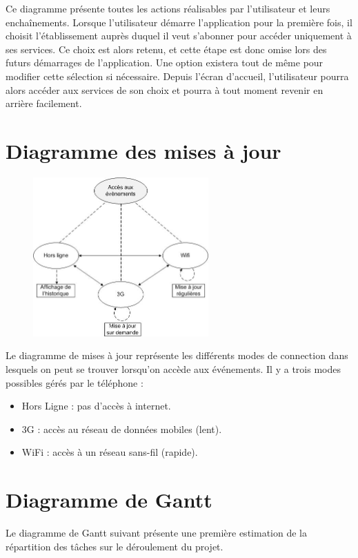 \documentclass [pdftex,12pt] {report}
\begin{document}
\newpage

Ce diagramme présente toutes les actions réalisables par l'utilisateur et leurs enchaînements.
Lorsque l'utilisateur démarre l'application pour la première fois, il choisit l'établissement auprès duquel il veut s'abonner pour accéder uniquement à ses services. Ce choix est alors retenu, et cette étape est donc omise lors des futurs démarrages de l'application. Une option existera tout de même pour modifier cette sélection si nécessaire. Depuis l'écran d'accueil, l'utilisateur pourra alors accéder aux services de son choix et pourra à tout moment revenir en arrière facilement.

\section{Diagramme des mises à jour}

\begin{figure}[h]
  \center
  \includegraphics[width=0.6\textwidth]{resources/state_diagram.jpg}
\end{figure}

Le diagramme de mises à jour représente les différents modes de connection dans lesquels on peut se trouver lorsqu'on accède aux événements. Il y a trois modes possibles gérés par le téléphone :\\
\begin{itemize}
\renewcommand{\labelitemi}{$\bullet$}
 \item Hors Ligne : pas d'accès à internet.
 \item 3G :  accès au réseau de données mobiles (lent).
 \item WiFi : accès à un réseau sans-fil (rapide).
\end{itemize}

\section{Diagramme de Gantt}
Le diagramme de Gantt suivant présente une première estimation de la répartition des tâches sur le déroulement du projet.
\end{document}
